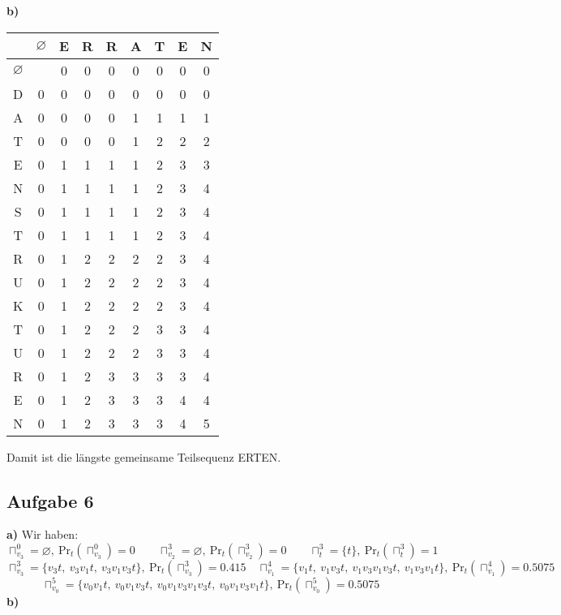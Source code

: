 \documentclass[a4paper,graphics,11pt]{article}
\newcommand{\aufgabe}[1]{\subsection*{Aufgabe #1}}
\begin{document}
\textbf{b)}

\begin{center}
\begin{tabular}{c|*{7}{c|}c}
    & $\varnothing$ & E & R & R & A & T & E & N\\
    \hline
    $\varnothing$ & & 0 & 0 & 0 & 0 & 0 & 0 & 0\\
    \hline
    D & 0 & 0 & 0 & 0 & 0 & 0 & 0 & 0\\
    \hline
    A & 0 & 0 & 0 & 0 & 1 & 1 & 1 & 1\\
    \hline
    T & 0 & 0 & 0 & 0 & 1 & 2 & 2 & 2\\
    \hline
    E & 0 & 1 & 1 & 1 & 1 & 2 & 3 & 3\\
    \hline
    N & 0 & 1 & 1 & 1 & 1 & 2 & 3 & 4\\
    \hline
    S & 0 & 1 & 1 & 1 & 1 & 2 & 3 & 4\\
    \hline
    T & 0 & 1 & 1 & 1 & 1 & 2 & 3 & 4\\
    \hline
    R & 0 & 1 & 2 & 2 & 2 & 2 & 3 & 4\\
    \hline
    U & 0 & 1 & 2 & 2 & 2 & 2 & 3 & 4\\
    \hline
    K & 0 & 1 & 2 & 2 & 2 & 2 & 3 & 4\\
    \hline
    T & 0 & 1 & 2 & 2 & 2 & 3 & 3 & 4\\
    \hline
    U & 0 & 1 & 2 & 2 & 2 & 3 & 3 & 4\\
    \hline
    R & 0 & 1 & 2 & 3 & 3 & 3 & 3 & 4\\
    \hline
    E & 0 & 1 & 2 & 3 & 3 & 3 & 4 & 4\\
    \hline
    N & 0 & 1 & 2 & 3 & 3 & 3 & 4 & 5\\
\end{tabular}
\end{center}
Damit ist die längste gemeinsame Teilsequenz ERTEN.

\newpage

\aufgabe{6}
\textbf{a)}
Wir haben:
$$
    \sqcap_{v_3}^0 = \varnothing,\ \text{Pr}_{t}(\sqcap_{v_3}^0) = 0
    \qquad
    \sqcap_{v_2}^3 = \varnothing,\ \text{Pr}_{t}(\sqcap_{v_2}^3) = 0
    \qquad
    \sqcap_{t}^3 = \{t\},\ \text{Pr}_{t}(\sqcap_{t}^3) = 1
$$$$
    \sqcap_{v_3}^3 = \{v_3t,\ v_3v_1t,\ v_3v_1v_3t\},\ \text{Pr}_{t}(\sqcap_{v_3}^3) = 0.415
    \quad
    \sqcap_{v_1}^4 = \{v_1t,\ v_1v_3t,\ v_1v_3v_1v_3t,\ v_1v_3v_1t\},\ \text{Pr}_{t}(\sqcap_{v_1}^4) = 0.5075
$$$$
    \sqcap_{v_0}^5 = \{v_0v_1t,\ v_0v_1v_3t,\ v_0v_1v_3v_1v_3t,\ v_0v_1v_3v_1t\},\ \text{Pr}_{t}(\sqcap_{v_0}^5) = 0.5075
$$
\textbf{b)}
\end{document}
